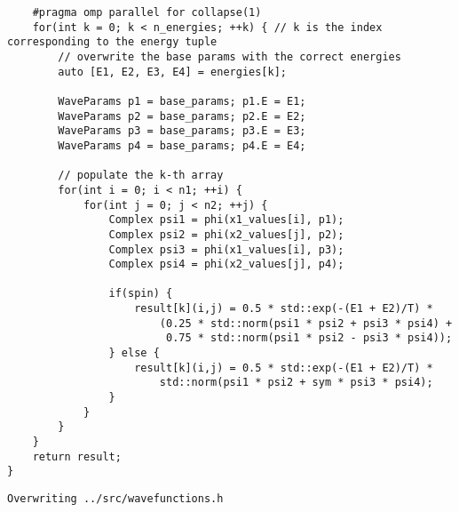 \documentclass[11pt]{article}
\begin{document}
\begin{verbatim}
    #pragma omp parallel for collapse(1)
    for(int k = 0; k < n_energies; ++k) { // k is the index corresponding to the energy tuple
        // overwrite the base params with the correct energies
        auto [E1, E2, E3, E4] = energies[k];

        WaveParams p1 = base_params; p1.E = E1;
        WaveParams p2 = base_params; p2.E = E2;
        WaveParams p3 = base_params; p3.E = E3;
        WaveParams p4 = base_params; p4.E = E4;

        // populate the k-th array
        for(int i = 0; i < n1; ++i) {
            for(int j = 0; j < n2; ++j) {
                Complex psi1 = phi(x1_values[i], p1);
                Complex psi2 = phi(x2_values[j], p2);
                Complex psi3 = phi(x1_values[i], p3);
                Complex psi4 = phi(x2_values[j], p4);

                if(spin) {
                    result[k](i,j) = 0.5 * std::exp(-(E1 + E2)/T) *
                        (0.25 * std::norm(psi1 * psi2 + psi3 * psi4) +
                         0.75 * std::norm(psi1 * psi2 - psi3 * psi4));
                } else {
                    result[k](i,j) = 0.5 * std::exp(-(E1 + E2)/T) *
                        std::norm(psi1 * psi2 + sym * psi3 * psi4);
                }
            }
        }
    }
    return result;
}
\end{verbatim}

\label{org13606c2}
\begin{verbatim}
Overwriting ../src/wavefunctions.h
\end{verbatim}
\end{document}
